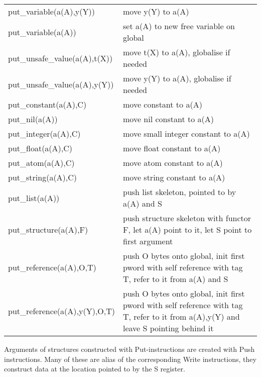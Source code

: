 \begin{tabular}{|p{}|p{}|}
\hline
put_variable(a(A),y(Y))         & move y(Y) to a(A)               \\
put_variable(a(A))              & set a(A) to new free variable on global  \\
put_unsafe_value(a(A),t(X))     & move t(X) to a(A), globalise if needed                          \\
put_unsafe_value(a(A),y(Y))     & move y(Y) to a(A), globalise if needed                          \\
put_constant(a(A),C)            & move constant to a(A)           \\
put_nil(a(A))                   & move nil constant to a(A)              \\
put_integer(a(A),C)             & move small integer constant to a(A)              \\
put_float(a(A),C)               & move float constant to a(A)              \\
put_atom(a(A),C)                & move atom constant to a(A)              \\
put_string(a(A),C)              & move string constant to a(A)              \\
put_list(a(A))                  & push list skeleton, pointed to by a(A) and S          \\
put_structure(a(A),F)           & push structure skeleton with functor F,
                                let a(A) point to it, let S point to first argument\\
\hline
put_reference(a(A),O,T) & push O bytes onto global, init first pword
            with self reference with tag T, refer to it from a(A) and S\\
put_reference(a(A),y(Y),O,T) & push O bytes onto global, init first
            pword with self reference with tag T, refer to it from
            a(A),y(Y) and leave S pointing behind it\\
\hline
\end{tabular}

Arguments of structures constructed with Put-instructions are created
with Push instructions. Many of these are alias of the corresponding
Write instructions, they construct data at the location pointed to by the
S register.


